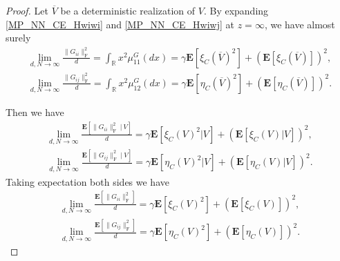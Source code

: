 \documentclass[10pt,a4paper]{amsart}
\newcommand{\E}{\mathbf{E}}
\newcommand{\R}{\mathbb{R}}
\newcommand{\bea}{\begin{equation}\begin{aligned}}
\newcommand{\eea}{\end{aligned}\end{equation}}
\newcommand{\rw}{\rightarrow}
\renewcommand{\l}{\left}
\renewcommand{\r}{\right}
\begin{document}
\begin{proof}
Let $\overline{V}$ be a deterministic realization of $V$. By expanding \eqref{MP_NN_CE_Hwiwi} and \eqref{MP_NN_CE_Hwiwj} at $z=\infty$, we have almost surely 
\bea
\lim_{d,N\rw\infty}\frac{\|G_{ii}\|_{\operatorname{F}}^2}{d}=\int_\R x^2\mu_{11}^G(dx)=\gamma\E[\xi_C(\overline{V})^2]+(\E[\xi_C(\overline{V})])^2,
\eea
\bea
\lim_{d,N\rw\infty}\frac{\|G_{ij}\|_{\operatorname{F}}^2}{d}=\int_\R x^2\mu_{12}^G(dx)=\gamma\E[\eta_C(\overline{V})^2]+(\E[\eta_C(\overline{V})])^2.
\eea

Then we have
\bea
\lim_{d,N\rw\infty}\frac{\E\l[\|G_{ii}\|_{\operatorname{F}}^2\ |\ V\r]}{d}=\gamma\E[\xi_C(V)^2|V]+(\E[\xi_C(V)|V])^2,
\eea
\bea
\lim_{d,N\rw\infty}\frac{\E\l[\|G_{ij}\|_{\operatorname{F}}^2\ |\ V\r]}{d}=\gamma\E[\eta_C(V)^2|V]+(\E[\eta_C(V)|V])^2.
\eea
Taking expectation both sides we have
\bea\label{eqRHShii}
\lim_{d,N\rw\infty}\frac{\E\l[\|G_{ii}\|_{\operatorname{F}}^2\r]}{d}=\gamma\E[\xi_C(V)^2]+(\E[\xi_C(V)])^2,
\eea
\bea\label{eqRHShij}
\lim_{d,N\rw\infty}\frac{\E\l[\|G_{ij}\|_{\operatorname{F}}^2\r]}{d}=\gamma\E[\eta_C(V)^2]+(\E[\eta_C(V)])^2.
\eea


\end{proof}
\end{document}
